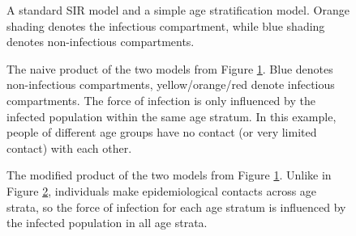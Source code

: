 \documentclass[pdflatex,sn-basic]{sn-jnl}%
\theoremstyle{definition}
\begin{document}
\FloatBarrier
\begin{figure}
    \centering
    
    \caption{A standard SIR model and a simple age stratification model. Orange shading denotes the infectious compartment, while blue shading denotes non-infectious compartments.}
    \label{fig:sir_age_strat}
\end{figure}

\begin{figure}
    \centering
    
    \caption{The naive product of the two models from Figure \ref{fig:sir_age_strat}. Blue denotes non-infectious compartments, yellow/orange/red denote infectious compartments. The force of infection is only influenced by the infected population within the same age stratum. In this example, people of different age groups have no contact (or very limited contact) with each other.}
    \label{fig:naive_product}
\end{figure}

\begin{figure}
    \centering
    
    \caption{The modified product of the two models from Figure \ref{fig:sir_age_strat}. Unlike in Figure \ref{fig:naive_product}, individuals make epidemiological contacts across age strata, so the force of infection for each age stratum is influenced by the infected population in all age strata.}
    \label{fig:modified_product}
\end{figure}
\end{document}
